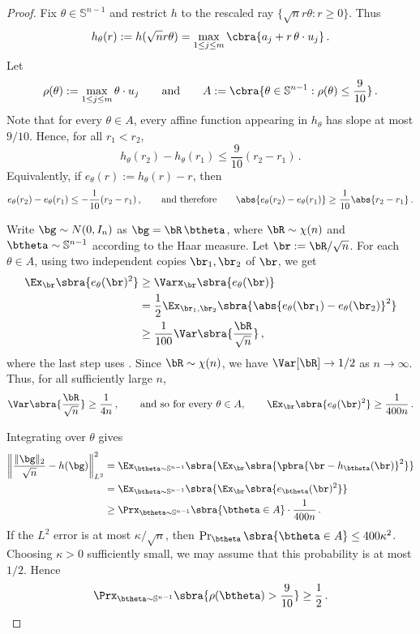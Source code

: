 \documentclass[11pt]{article}
\renewcommand{\S}{\mathbb{S}}
\begin{document}
\begin{proof}
	Fix $\theta\in \S^{n-1}$ and restrict $h$ to the rescaled ray
	$\{\sqrt n r\theta:r\geq 0\}$.  Thus
	\[
		h_\theta(r)
		:=
		h(\sqrt n r\theta)
		=
		\max_{1\leq j\leq m}\cbra{a_j+r\,\theta\cdot u_j}\,.
	\]
	Let
	\[
		\rho(\theta):=\max_{1\leq j\leq m}\theta\cdot u_j
		\qquad\text{and}\qquad
		A:=\cbra{\theta\in \S^{n-1}:\rho(\theta)\leq \frac{9}{10}}\,.
	\]
	Note that for every $\theta\in A$, every affine function appearing in $h_\theta$ has slope at most $9/10$. 
	Hence, for all $r_1<r_2$,
	\[
		h_\theta(r_2)-h_\theta(r_1)
		\leq
		\frac{9}{10}(r_2-r_1)\,.
	\]
	Equivalently, if $e_\theta(r):=h_\theta(r)-r$, then
	\begin{equation}
	\label{eq:abs-e-theta-lb}
		e_\theta(r_2)-e_\theta(r_1)
		\leq
		-\frac{1}{10}(r_2-r_1)\,,
		\qquad\text{and therefore}\qquad 
		\abs{e_\theta(r_2)-e_\theta(r_1)}
		\geq
		\frac{1}{10}\abs{r_2-r_1}\,.
	\end{equation}

	Write $\bg\sim N(0, I_n)$ as $\bg=\bR\,\btheta$, where $\bR \sim \chi(n)$ and $\btheta\sim\S^{n-1}$ according to the Haar measure.  
	Let $\br:=\bR/\sqrt n$.  For each $\theta\in A$, using two
	independent copies $\br_1,\br_2$ of $\br$, we get
	\begin{align*}
		\Ex_{\br}\sbra{e_\theta(\br)^2}
		&\geq
		\Varx_{\br}\sbra{e_\theta(\br)} \\
		&=
		\frac{1}{2}
		\Ex_{\br_1,\br_2}
		\sbra{
			\abs{e_\theta(\br_1)-e_\theta(\br_2)}^2
		} \\
		&\geq
		\frac{1}{100}
		\Var\sbra{\frac{\bR}{\sqrt n}}\,,
	\end{align*}
	where the last step uses .  
	Since $\bR\sim \chi(n)$, we have $\Var[\bR]\to 1/2$ as $n\to\infty$.
	Thus, for all sufficiently large $n$,
	\[
		\Var\sbra{\frac{\bR}{\sqrt n}}
		\geq
		\frac{1}{4n}\,,
		\qquad\text{and so for every}~\theta\in A,\qquad 
		\Ex_{\br}\sbra{e_\theta(\br)^2}
		\geq
		\frac{1}{400n}\,.
	\]
	
	Integrating over $\theta$ gives
	\begin{align*}
		\left\|
			\frac{\|\bg\|_2}{\sqrt n}-h(\bg)
		\right\|_{L^2}^2
		&=
		\Ex_{\btheta\sim\S^{n-1}}
		\sbra{
			\Ex_{\br}
			\sbra{
				\pbra{\br-h_{\btheta}(\br)}^2
			}
		} \\
		&=
		\Ex_{\btheta\sim\S^{n-1}}
		\sbra{
			\Ex_{\br}
			\sbra{e_{\btheta}(\br)^2}
		} \\
		&\geq
		\Prx_{\btheta\sim\S^{n-1}}\sbra{\btheta\in A}\cdot \frac{1}{400n}\,.
	\end{align*}
	If the $L^2$ error is at most $\kappa/\sqrt n$, then $\Pr_{\btheta}\sbra{\btheta\in A} \leq 400\kappa^2$. 
	Choosing $\kappa>0$ sufficiently small, we may assume that this probability is at most $1/2$. Hence
	\[
		\Prx_{\btheta\sim\S^{n-1}}
		\sbra{
			\rho(\btheta)>\frac{9}{10}
		}
		\geq
		\frac{1}{2}\,.
	\]


\end{proof}
\end{document}
